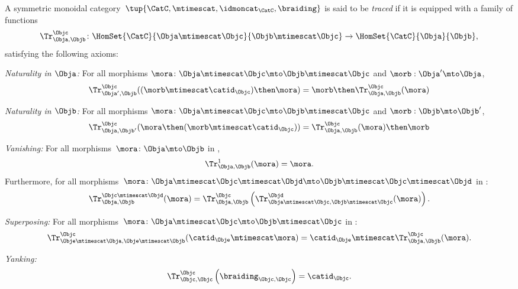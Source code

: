 \begin{ctdefinition}\label{def:traced-monoidal-cat}
    \label{def:traced-monoidal-category}
    A symmetric monoidal category~$\tup{\CatC,\mtimescat,\idmoncat_{\CatC}, \braiding}$ is said to be \emph{traced} if it is equipped with a family of functions
    \begin{equation}
        \Tr_{\Obja,\Objb}^\Objc\colon \HomSet{\CatC}{\Obja \mtimescat \Objc}{\Objb\mtimescat \Objc}\to \HomSet{\CatC}{\Obja}{\Objb},
    \end{equation}
    satisfying the following axioms:
    \begin{compactenum}
    	\item \emph{Naturality in $\Obja$:} For all morphisms $\mora\colon \Obja\mtimescat \Objc \mto \Objb\mtimescat \Objc$ and $\morb : \Obja' \mto \Obja$,
	\begin{equation}
            \Tr_{\Obja', \Objb}^\Objc ( (\morb \mtimescat \catid_\Objc) \then \mora) = \morb \then \Tr_{\Obja, \Objb}^\Objc (\mora) 
        \end{equation}
	\item \emph{Naturality in $\Objb$:} For all morphisms $\mora\colon \Obja\mtimescat \Objc \mto \Objb\mtimescat \Objc$ and $\morb : \Objb \mto \Objb'$,
	\begin{equation}
            \Tr_{\Obja, \Objb'}^\Objc ( \mora \then (\morb \mtimescat \catid_\Objc) ) =  \Tr_{\Obja, \Objb}^\Objc (\mora) \then \morb
        \end{equation}
        \item \emph{Vanishing:} For all morphisms~$\mora \colon \Obja\mto \Objb$ in \CatC,
        \begin{equation}
            \label{eq:vanishing_1}
            \Tr_{\Obja,\Objb}^1(\mora)=\mora.
        \end{equation}
        Furthermore, for all morphisms~$\mora \colon \Obja\mtimescat \Objc \mtimescat \Objd \mto \Objb\mtimescat \Objc \mtimescat \Objd$ in \CatC:
        \begin{equation}
            \label{eq:vanishing_2}
            \Tr_{\Obja,\Objb}^{\Objc\mtimescat \Objd}(\mora)=\Tr_{\Obja,\Objb}^\Objc\left(
            \Tr_{\Obja \mtimescat \Objc , \Objb \mtimescat \Objc}^\Objd(\mora)\right).
        \end{equation}
        \item \emph{Superposing:} For all morphisms~$\mora\colon \Obja\mtimescat \Objc \mto \Objb\mtimescat \Objc$ in \CatC:
        \begin{equation}
            \label{eq:superposing}
            \Tr_{\Obje\mtimescat \Obja,\Obje\mtimescat \Objb}^{\Objc}(\catid_\Obje\mtimescat \mora)=\catid_\Obje\mtimescat \Tr_{\Obja,\Objb}^\Objc(\mora).
        \end{equation}
        \item \emph{Yanking:}
        \begin{equation}
            \label{eq:yanking}
            \Tr_{\Objc,\Objc}^\Objc\left(\braiding_{\Objc,\Objc}\right)=\catid_\Objc.
        \end{equation}
    \end{compactenum}
\end{ctdefinition}

